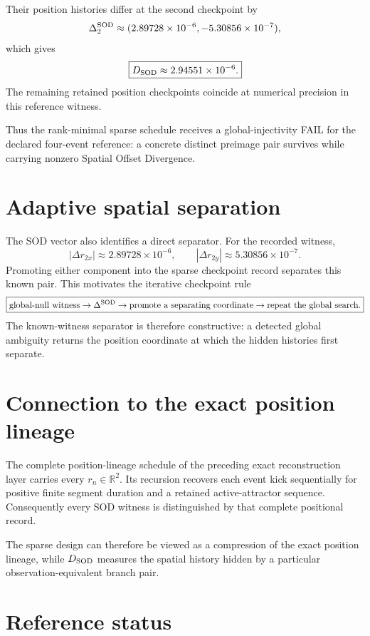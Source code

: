 \documentclass[11pt]{book}
\begin{document}
Their position histories differ at the second checkpoint by
\[
\Delta_2^{\rm SOD}
\approx
(2.89728\times10^{-6},-5.30856\times10^{-7}),
\]
which gives
\[
\boxed{
D_{\rm SOD}\approx2.94551\times10^{-6}.
}
\]
The remaining retained position checkpoints coincide at numerical precision in this reference witness.

Thus the rank-minimal sparse schedule receives a global-injectivity FAIL for the declared four-event reference: a concrete distinct preimage pair survives while carrying nonzero Spatial Offset Divergence.

\section{Adaptive spatial separation}

The SOD vector also identifies a direct separator. For the recorded witness,
\[
|\Delta r_{2x}|\approx2.89728\times10^{-6},
\qquad
|\Delta r_{2y}|\approx5.30856\times10^{-7}.
\]
Promoting either component into the sparse checkpoint record separates this known pair. This motivates the iterative checkpoint rule
\[
\boxed{
\text{global-null witness}
\rightarrow
\Delta^{\rm SOD}
\rightarrow
\text{promote a separating coordinate}
\rightarrow
\text{repeat the global search}.
}
\]
The known-witness separator is therefore constructive: a detected global ambiguity returns the position coordinate at which the hidden histories first separate.

\section{Connection to the exact position lineage}

The complete position-lineage schedule of the preceding exact reconstruction layer carries every $r_n\in\mathbb R^2$. Its recursion recovers each event kick sequentially for positive finite segment duration and a retained active-attractor sequence. Consequently every SOD witness is distinguished by that complete positional record.

The sparse design can therefore be viewed as a compression of the exact position lineage, while $D_{\rm SOD}$ measures the spatial history hidden by a particular observation-equivalent branch pair.

\section{Reference status}
\end{document}
